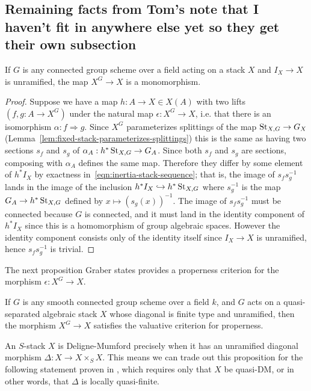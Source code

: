 \documentclass[12pt,dvipsnames]{amsart}
\begin{document}
\subsection{Remaining facts from Tom's note that I haven't fit in anywhere else yet so they get their own subsection}\label{rl-000K}


\begin{proposition}\label{rl-000L}\label{prop:condition-for-monomorphism}
  If $G$ is any connected group scheme over a field acting on a stack $X$ and \(I_X\to X\) is unramified, the map $X^{G}\to X$ is a monomorphism.
\end{proposition}
\begin{proof}
  Suppose we have a map $h:A\to X\in X(A)$ with two lifts $(f,g:A\to X^{G})$ under the natural map $\epsilon:X^{G}\to X$, i.e. that there is an isomorphism $\alpha:f\Rightarrow g$. Since $X^{G}$ parameterizes splittings of the map $\operatorname{St}_{X,G}\to G_X$ (Lemma~\ref{lem:fixed-stack-parameterizes-splittings}) this is the same as having two sections $s_f$ and $s_g$ of $\alpha_A:h^*\operatorname{St}_{X,G}\to G_A$. Since both \(s_f\) and \(s_g\) are sections, composing with \(\alpha_A\) defines the same map. Therefore they differ by some element of \(h^*I_X\) by exactness in~\eqref{eqn:inertia-stack-sequence}; that is, the image of $s_fs^{-1}_g$ lands in the image of the inclusion $h^*I_X\hookrightarrow h^*\operatorname{St}_{X,G}$ where $s_g^{-1}$ is the map $G_A\to h^*\operatorname{St}_{X,G}$ defined by $x\mapsto (s_g(x))^{-1}$. The image of \(s_fs^{-1}_g\) must be connected because \(G\) is connected, and it must land in the identity component of \(h^*I_X\) since this is a homomorphism of group algebraic spaces. However the identity component consists only of the identity itself since \(I_X \to X\) is unramified, hence \(s_fs^{-1}_g\) is trivial.
\end{proof}

The next proposition Graber states provides a properness criterion for the morphism \(\epsilon:X^{G}\to X\).

\begin{proposition}\label{rl-000M}
  If \(G\) is any smooth connected group scheme over a field \(k\), and \(G\) acts on a quasi-separated algebraic stack \(X\) whose diagonal is finite type and unramified, then the morphism \(X^{G}\to X\) satisfies the valuative criterion for properness.
\end{proposition}

An \(S\)-stack \(X\) is Deligne-Mumford precisely when it has an unramified diagonal morphism \(\Delta:X\to X\times_S X\). This means we can trade out this proposition for the following statement proven in  \cite{aranha-khan-latyntsev-etal_VirtualLocalizationRevisited2025}, which requires only that \(X\) be quasi-DM, or in other words, that \(\Delta\) is locally quasi-finite.
\end{document}

